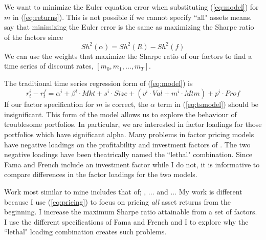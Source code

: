 We want to minimize the Euler equation error when substituting 
(\ref{eq:model}) for $m$ in (\ref{eq:returns}).
This is not possible if we cannot specify ``all" assets means.
\cite{barillas2016alpha} say that minimizing the Euler error is the same as 
maximizing the Sharpe ratio of the factors since
\begin{equation}
\label{eq:Sh2}
Sh^2(\alpha) = Sh^2(R) - Sh^2(f)
\end{equation}
We can use the weights that maximize the Sharpe ratio of our factors to find a 
time series of discount rates, $[m_0, m_1, \ldots, m_T]$.

The traditional time series regression form of 
(\ref{eq:model}) is
\begin{equation}
\label{eq:tsmodel}
r_t^i - r_t^f= \alpha^i + \beta^i \cdot Mkt + s^i \cdot Size +
\left( v^i \cdot Val + m^i \cdot Mtm \right) +
p^i \cdot Prof
\end{equation}
If our factor specification for $m$ is correct, the $\alpha$ term in 
(\ref{eq:tsmodel}) should be insignificant.
This form of the model allows us to explore the behaviour of troublesome 
portfolios.
In particular, we are interested in factor loadings for those portfolios which 
have significant alpha.
Many problems in factor pricing models have negative loadings on the 
profitability and investment factors of \cite{fama2016dissecting}.
The two negative loadings have been theatrically named the ``lethal" 
combination.
Since Fama and French include an investment factor while I do 
not, it is informative to compare differences in the factor loadings for the 
two models.
 
Work most similar to mine includes that of; \cite{fama2016choosing},
... and ...
My work is different because I use (\ref{eq:pricing}) to focus on pricing 
\emph{all} asset returns from the beginning.
I increase the maximum Sharpe ratio attainable from a set of factors.
I use the different specifications of Fama and French and I to explore why the 
``lethal" loading combination creates such problems.






















